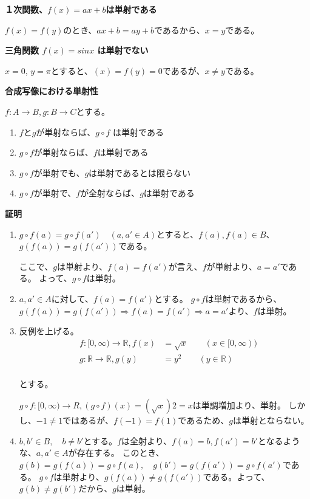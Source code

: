 \documentclass[dvipdfmx,autodetect-engine]{jsarticle}
\begin{document}
\exam

{\bf １次関数、$f(x) = ax+b$は単射である }

$f(x) = f(y)$のとき、$ax+b = ay+b$であるから、$x=y$である。

\exam
{\bf 三角関数 $f(x) = sinx$ は単射でない }

$x=0$, $y=\pi$とすると、$(x) = f(y) =0$であるが、$x \neq y$である。

\prop
\label{eq:injectiveProposition}

 {\bf 合成写像における単射性 }
 
 $f:A \to B, g: B \to C$とする。

\begin{enumerate}
\renewcommand{\labelenumi}{(\arabic{enumi})}
	\item $f$と$g$が単射ならば、$g \circ f$ は単射である
	\item $g \circ f$が単射ならば、$f$は単射である
	\item $g \circ f$が単射でも、$g$は単射であるとは限らない
	\item $g \circ f$が単射で、$f$が全射ならば、$g$は単射である
\end{enumerate}

{\bf 証明}

\begin{enumerate}
\renewcommand{\labelenumi}{(\arabic{enumi})}
	\item $g \circ f(a) = g \circ f(a') \quad (a, a' \in A)$とすると、$f(a), f(a) \in B$、$g(f(a)) = g(f(a'))$である。
	
	ここで、$g$は単射より、$f(a) = f(a')$が言え、$f$が単射より、$a = a'$である。
	よって、$g \circ f$は単射。
	
	\item $a,a' \in A$に対して、$f(a) = f(a')$とする。
	$g \circ f$は単射であるから、$g(f(a)) = g(f(a')) \Rightarrow f(a) = f(a') \Rightarrow a = a'$より、$f$は単射。

    \item 反例を上げる。
    \begin{eqnarray*}
    &f:[0,∞) \to \mathbb{R}, f(x) &= \sqrt{x} \quad \quad (x \in [0,∞)) \\
    &g:\mathbb{R} \to \mathbb{R}, g(y) &= y^2  \quad \quad (y \in \mathbb{R}) \\
    \end{eqnarray*}
    
    とする。
    
    $g \circ f : [0,∞) \to R, (g \circ f)(x) = (\sqrt{x})2= x$は単調増加より、単射。
    しかし、$-1 \neq 1$ではあるが、$f(-1) = f(1)$であるため、$g$は単射とならない。
    
    
    \item $b, b' \in B, \quad b \neq b'$とする。$f$は全射より、$f(a) = b, f(a') = b'$となるような、$a, a' \in A$が存在する。
    このとき、$g(b) = g(f(a)) = g \circ f(a), \quad g(b') = g(f(a')) = g \circ f(a')$である。
    $g \circ f$は単射より、$g(f(a)) \neq g(f(a'))$である。よって、$g(b) \neq g(b')$だから、$g$は単射。
	
\end{enumerate}
\end{document}

